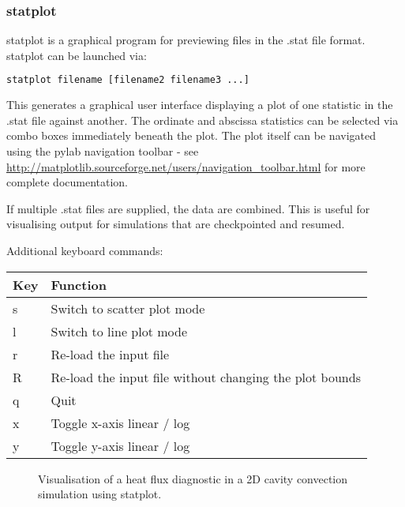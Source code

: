
\subsubsection{statplot}
\label{sect:statplot}

statplot is a graphical program for previewing files in the .stat file format.
statplot can be launched via:

\begin{lstlisting}[language = Bash]
statplot filename [filename2 filename3 ...]
\end{lstlisting}

This generates a graphical user interface displaying a plot of one statistic in
the .stat file against another. The ordinate and abscissa statistics can be
selected via combo boxes immediately beneath the plot. The plot itself can
be navigated using the pylab navigation toolbar - see
\url{http://matplotlib.sourceforge.net/users/navigation_toolbar.html} for
more complete documentation.

If multiple .stat files are supplied, the data are combined. This is useful for
visualising output for simulations that are checkpointed and resumed. 

Additional keyboard commands:

\begin{center}
  \begin{tabular}{| l | l |}
    \hline
    Key & Function \\
    \hline
    s   & Switch to scatter plot mode \\
    l   & Switch to line plot mode \\
    r   & Re-load the input file \\
    R   & Re-load the input file without changing the plot bounds \\
    q   & Quit \\
    x   & Toggle x-axis linear / log \\
    y   & Toggle y-axis linear / log \\
    \hline
  \end{tabular}
\end{center}

\begin{figure}[ht]
  \centering
  \caption{Visualisation of a heat flux diagnostic in a 2D cavity convection
           simulation using statplot.}
  \label{fig:statplot}
\end{figure}

